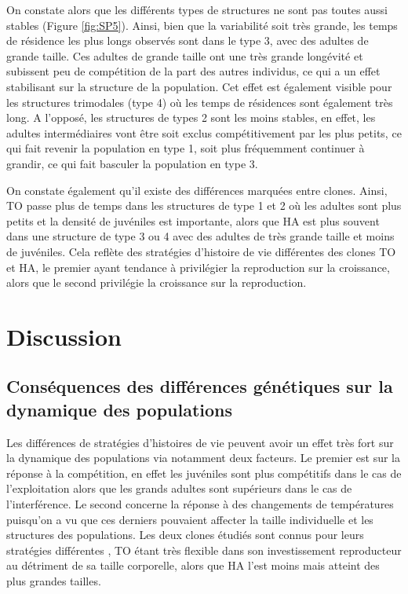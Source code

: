 On constate alors que les différents types de structures ne sont pas toutes
aussi stables (Figure \ref{fig:SP5}). Ainsi, bien que la variabilité soit très grande,
les temps de résidence les plus longs observés sont dans le type 3, avec des
adultes de grande taille.
Ces adultes de grande taille ont une très grande longévité et subissent peu de
compétition de la part des autres individus, ce qui a un effet stabilisant sur
la structure de la population. Cet effet est également visible pour les
structures trimodales (type 4) où les temps de résidences sont également très
long. A l'opposé, les structures de types 2 sont les moins stables, en effet,
les adultes intermédiaires vont être soit exclus compétitivement par les plus
petits, ce qui fait revenir la population en type 1, soit plus fréquemment
continuer à grandir, ce qui fait basculer la population en type 3.

On constate également qu'il existe des différences marquées entre clones. Ainsi,
TO passe plus de temps dans les structures de type 1 et 2 où les adultes sont
plus petits et la densité de juvéniles est importante, alors que HA est plus
souvent dans une structure de type 3 ou 4 avec des adultes de très grande taille
et moins de juvéniles. Cela reflète des stratégies d'histoire de vie différentes
des clones TO et HA, le premier ayant tendance à privilégier la reproduction sur
la croissance, alors que le second privilégie la croissance sur la reproduction.

\section{Discussion}

\subsection{Conséquences des différences génétiques sur la dynamique des
populations}

Les différences de stratégies d'histoires de vie peuvent avoir un effet très
fort sur la dynamique des populations via notamment deux facteurs. Le premier
est sur la réponse à la compétition, en effet les juvéniles sont plus
compétitifs dans le cas de l'exploitation alors que les grands adultes sont supérieurs dans
le cas de l'interférence. Le second concerne la réponse à des changements de
températures puisqu'on a vu que ces derniers pouvaient affecter la taille
individuelle et les structures des populations. Les deux clones étudiés sont
connus pour leurs stratégies différentes \autocites{tully2006a,tully2008a}, TO
étant très flexible dans son investissement reproducteur au détriment de sa
taille corporelle, alors que HA l'est moins mais atteint des plus
grandes tailles.

